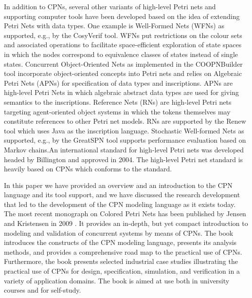 In addition to CPNs, several other variants of high-level Petri nets
and supporting computer tools have been developed based on the idea of
extending Petri Nets with data types. One example is Well-Formed Nets
(WFNs) \cite{wfns} as supported, e.g., by the CosyVerif tool. WFNs put
restrictions on the colour sets and associated operations to
facilitate space-efficient exploration of state spaces in which the
nodes correspond to equivalence classes of states instead of single
states. Concurrent Object-Oriented Nets \cite{coopn} as implemented in
the COOPNBuilder tool incorporate object-oriented concepts into Petri
nets and relies on Algebraic Petri Nets (APNs) \cite{apn} for
specification of data types and inscriptions. APNs are high-level
Petri Nets in which algebraic abstract data types are used for giving
semantics to the inscriptions. Reference Nets (RNs) \cite{rns} are
high-level Petri nets targeting agent-oriented object systems in which
the tokens themselves may constitute references to other Petri net
models. RNs are supported by the Renew tool which uses Java as the
inscription language. Stochastic Well-formed Nets \cite{swns} as
supported, e.g., by the GreatSPN tool supports performance evaluation
based on Markov chains.An international standard for high-level Petri
nets was developed headed by Billington \cite{hcpnstandard} and
approved in 2004. The high-level Petri net standard is heavily based
on CPNs which conforms to the standard.



In this paper we have provided an overview and an introduction to the
CPN language and its tool support, and we have discussed the research
development that led to the development of the CPN modeling language
as it exists today. The most recent monograph on Colored Petri Nets
has been published by Jensen and Kristensen in 2009
\cite{newcpnbook}. It provides an in-depth, but yet compact
introduction to modeling and validation of concurrent systems by means
of CPNs. The book introduces the constructs of the CPN modeling
language, presents its analysis methods, and provides a comprehensive
road map to the practical use of CPNs. Furthermore, the book presents
selected industrial case studies illustrating the practical use of
CPNs for design, specification, simulation, and verification in a
variety of application domains. The book is aimed at use both in
university courses and for self-study.

